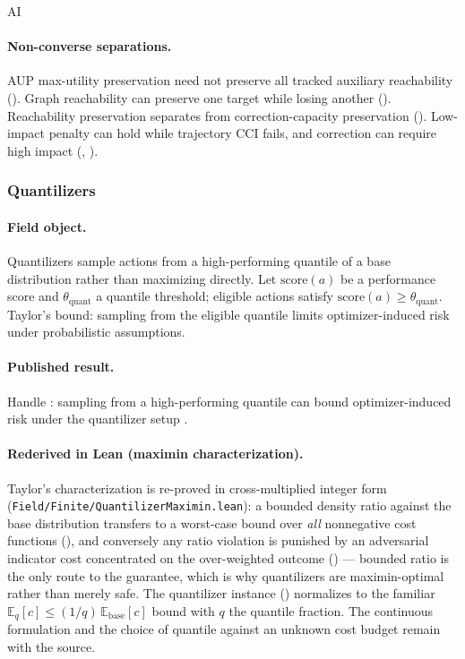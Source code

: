 \begin{authbar}{AI}
\paragraph{Non-converse separations.}
AUP max-utility preservation need not preserve all tracked auxiliary reachability ().
Graph reachability can preserve one target while losing another ().
Reachability preservation separates from correction-capacity preservation ().
Low-impact penalty can hold while trajectory \(\mathrm{CCI}\) fails, and correction can require high impact (, ).

\subsubsection{Quantilizers \autocite{taylor2015quantilizers}}
\label{sec:appi-field-quantil}

\paragraph{Field object.}
Quantilizers sample actions from a high-performing quantile of a base distribution rather than maximizing directly.
Let \(\mathrm{score}(a)\) be a performance score and \(\theta_{\mathrm{quant}}\) a quantile threshold; eligible actions satisfy \(\mathrm{score}(a)\ge\theta_{\mathrm{quant}}\).
Taylor's bound: sampling from the eligible quantile limits optimizer-induced risk under probabilistic assumptions.

\paragraph{Published result.}
Handle : sampling from a high-performing quantile can bound optimizer-induced risk under the quantilizer setup \autocite{taylor2015quantilizers}.

\paragraph{Rederived in Lean (maximin characterization).}
Taylor's characterization is re-proved in cross-multiplied integer form (\texttt{Field/Finite/QuantilizerMaximin.lean}): a bounded density ratio against the base distribution transfers to a worst-case bound over \emph{all} nonnegative cost functions (), and conversely any ratio violation is punished by an adversarial indicator cost concentrated on the over-weighted outcome () --- bounded ratio is the only route to the guarantee, which is why quantilizers are maximin-optimal rather than merely safe.
The quantilizer instance () normalizes to the familiar \(\mathbb E_q[c]\le(1/q)\,\mathbb E_{\mathrm{base}}[c]\) bound with \(q\) the quantile fraction.
The continuous formulation and the choice of quantile against an unknown cost budget remain with the source.


\end{authbar}
